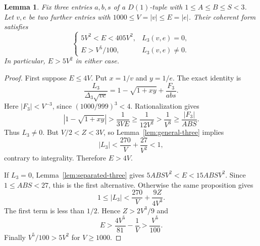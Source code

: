 \documentclass[12pt]{article}
\newtheorem{lemma}[theorem]{Lemma}
\numberwithin{equation}{section}
\begin{document}
\begin{lemma}\label{sm:five-small-anchor-alternative}
Fix three entries $a,b,s$ of a $D(1)$-tuple with
$1\le A\le B\le S<3$. Let $v,e$ be two further entries with
$1000\le V=|v|\le E=|e|$. Their coherent form satisfies
\[
 \begin{cases}
  5V^2<E<405V^2,&L_3(v,e)=0,\\
  E>V^5/100,&L_3(v,e)\ne0.
 \end{cases}
\]
In particular, $E>5V^2$ in either case.
\end{lemma}
\begin{proof}
First suppose $E\le4V$. Put $x=1/v$ and $y=1/e$.
The exact identity is
\[
 \frac{L_3}{\Delta_3\sqrt{ve}}
   =1-\sqrt{1+xy}+\frac{F_3}{abs}.
\]
Here $|F_3|<V^{-3}$, since
$(1000/999)^3<4$. Rationalization gives
\[
 |1-\sqrt{1+xy}|>\frac1{3VE}
       \ge\frac1{12V^2}>\frac1{V^3}\ge\frac{|F_3|}{ABS}.
\]
Thus $L_3\ne0$. But $V/2<Z<3V$, so
Lemma~\ref{lem:general-three} implies
\[
 |L_3|<\frac{270}{V}+\frac{27}{V^2}<1,
\]
contrary to integrality. Therefore $E>4V$.

If $L_3=0$, Lemma~\ref{lem:separated-three} gives
$5ABS V^2<E<15ABS V^2$. Since $1\le ABS<27$, this is the
first alternative. Otherwise the same proposition gives
\[
 1\le|L_3|<\frac{270}{V}+\frac{9Z}{4V^3}.
\]
The first term is less than $1/2$. Hence $Z>2V^3/9$ and
\[
 E>\frac{4V^5}{81}-\frac1V>\frac{V^5}{100}.
\]
Finally $V^5/100>5V^2$ for $V\ge1000$.
\end{proof}
\end{document}
